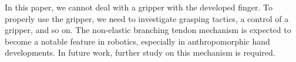 \documentclass{llncs}
\begin{document}
In this paper, we cannot deal with a gripper with the developed finger.
To properly use the gripper, we need to investigate grasping tactics, a control of a gripper, and so on.
The non-elastic branching tendon mechanism is expected to become a notable feature in robotics,
especially in anthropomorphic hand developments.
In future work, further study on this mechanism is required.


\end{document}
